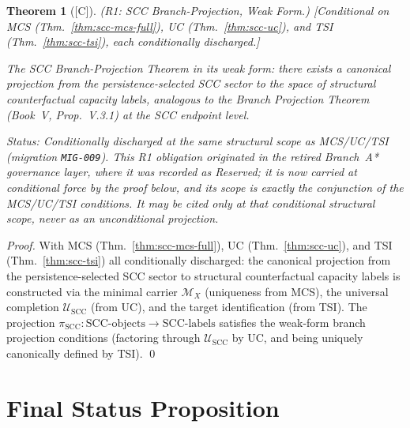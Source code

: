 \documentclass[12pt,oneside]{amsbook}
\theoremstyle{plain}
\newtheorem{theorem}{Theorem}[section]
\theoremstyle{definition}
\theoremstyle{remark}
\newcommand{\status}[1]{\textup{[#1]}}
\begin{document}
\begin{theorem}[\status{C}]\label{thm:scc-r1}
\textup{(R1: SCC Branch-Projection, Weak Form.)}
\textup{[Conditional on MCS (Thm.~\ref{thm:scc-mcs-full}),
UC (Thm.~\ref{thm:scc-uc}), and TSI (Thm.~\ref{thm:scc-tsi}),
each conditionally discharged.]}

The SCC Branch-Projection Theorem in its weak form: there exists
a canonical projection from the persistence-selected SCC sector
to the space of structural counterfactual capacity labels,
analogous to the Branch Projection Theorem (Book~V, Prop.~V.3.1)
at the SCC endpoint level.

\emph{Status:} Conditionally discharged at the same structural scope as
MCS/UC/TSI (migration \texttt{MIG-009}). This R1 obligation originated
in the retired Branch~A* governance layer, where it was recorded as
\emph{Reserved}; it is now carried at conditional force by the proof
below, and its scope is exactly the conjunction of the MCS/UC/TSI
conditions. It may be cited only at that conditional structural scope,
never as an unconditional projection.
\end{theorem}
\begin{proof}
With MCS (Thm.~\ref{thm:scc-mcs-full}), UC (Thm.~\ref{thm:scc-uc}),
and TSI (Thm.~\ref{thm:scc-tsi}) all conditionally discharged:
the canonical projection from the persistence-selected SCC sector
to structural counterfactual capacity labels is constructed via the
minimal carrier $\mathcal{M}_X$ (uniqueness from MCS), the
universal completion $\mathcal{U}_{\mathrm{SCC}}$ (from UC), and
the target identification (from TSI). The projection
$\pi_{\mathrm{SCC}} : \mathrm{SCC\text{-}objects} \to
\mathrm{SCC\text{-}labels}$ satisfies the weak-form branch
projection conditions (factoring through $\mathcal{U}_{\mathrm{SCC}}$
by UC, and being uniquely canonically defined by TSI). \qed
\end{proof}


\section{Final Status Proposition}
\label{sec:status}
\end{document}
